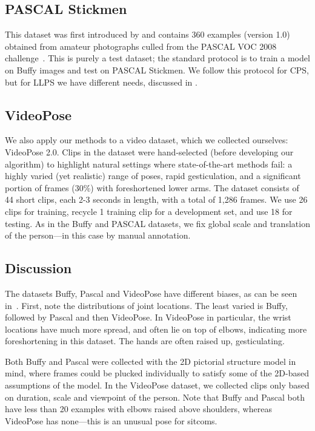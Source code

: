 \subsection{PASCAL Stickmen}  This dataset was first introduced by 
\citet{eichner09} and contains 360 examples (version 1.0) obtained from amateur 
photographs culled from the PASCAL VOC 2008 challenge~\citep{voc09}.  This is 
purely a test dataset; the standard protocol is to train a model on Buffy 
images and test on PASCAL Stickmen. We follow this protocol for CPS, but for 
LLPS we have different needs, discussed in .

\subsection{VideoPose}

We also apply our methods to a video dataset, which we collected ourselves: 
VideoPose 2.0.  Clips in the dataset were hand-selected (before developing our 
algorithm) to highlight natural settings where state-of-the-art methods fail: a 
highly varied (yet realistic) range of poses, rapid gesticulation, and a 
significant portion of frames (30\%) with foreshortened lower arms.  The 
dataset consists of 44 short clips, each 2-3 seconds in length, with a total of 
1,286 frames.  We use 26 clips for training, recycle 1 training clip for a 
development set, and use 18 for testing.  As in the Buffy and PASCAL datasets, 
we fix global scale and translation of the person---in this case by manual 
annotation.


\subsection{Discussion}  The datasets Buffy, Pascal and VideoPose have 
different biases, as can be seen in~.  First, note 
the distributions of joint locations.  The least varied is Buffy, followed by 
Pascal and then VideoPose.  In VideoPose in particular, the wrist locations 
have much more spread, and often lie on top of elbows, indicating more 
foreshortening in this dataset.  The hands are often raised up, gesticulating.  

Both Buffy and Pascal were collected with the 2D pictorial structure model in 
mind, where frames could be plucked individually to satisfy some of the 
2D-based assumptions of the model.  In the VideoPose dataset, we collected 
clips only based on duration, scale and viewpoint of the person.  Note that 
Buffy and Pascal both have less than 20 examples with elbows raised above 
shoulders, whereas VideoPose has none---this is an unusual pose for sitcoms.

